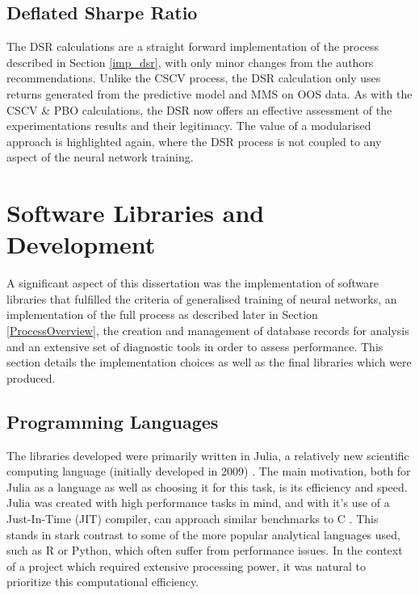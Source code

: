 \documentclass[a4paper,11pt,oneside]{article}
\theoremstyle{plain}
\theoremstyle{definition}
\begin{document}
	\subsection{Deflated Sharpe Ratio}\label{proc_dsr}
	
	The DSR calculations are a straight forward implementation of the process described in Section \ref{imp_dsr}, with only minor changes from the authors recommendations. Unlike the CSCV process, the DSR calculation only uses returns generated from the predictive model and MMS on OOS data. As with the CSCV \& PBO calculations, the DSR now offers an effective assessment of the experimentations results and their legitimacy. The value of a modularised approach is highlighted again, where the DSR process is not coupled to any aspect of the neural network training.
	
	
	
	
	
	
	
	
	
	
	
	
	
		\newpage
	\section{Software Libraries and Development}\label{Software}
	
	A significant aspect of this dissertation was the implementation of software libraries that fulfilled the criteria of generalised training of neural networks, an implementation of the full process as described later in Section \ref{ProcessOverview}, the creation and management of database records for analysis and an extensive set of diagnostic tools in order to assess performance. This section details the implementation choices as well as the final libraries which were produced.
	
	
	\subsection{Programming Languages}
	
	The libraries developed were primarily written in Julia, a relatively new scientific computing language (initially developed in 2009) \citep{DCRoot, Julia}. The main motivation, both for Julia as a language as well as choosing it for this task, is its efficiency and speed. Julia was created with high performance tasks in mind, and with it's use of a Just-In-Time (JIT) compiler, can approach similar benchmarks to C \citep{Perkel}. This stands in stark contrast to some of the more popular analytical languages used, such as R or Python, which often suffer from performance issues. In the context of a project which required extensive processing power, it was natural to prioritize this computational efficiency. \newline
	
\end{document}
